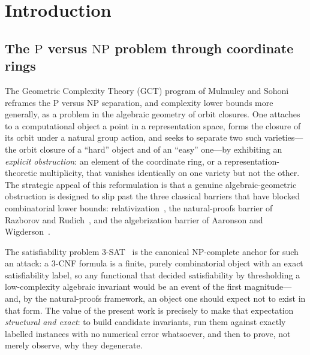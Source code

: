 \documentclass[pdflatex,sn-mathphys-num]{sn-jnl}
\theoremstyle{thmstyleone}%
\theoremstyle{thmstyletwo}%
\theoremstyle{thmstylethree}%
\begin{document}
\maketitle
\section{Introduction}\label{sec:intro}

\subsection{The \texorpdfstring{$\mathrm{P}$ versus $\mathrm{NP}$}{P vs NP} problem through
coordinate rings}

The Geometric Complexity Theory (GCT) program of Mulmuley and
Sohoni~\cite{GCT1,GCT2,MulmuleyCACM} reframes the $\mathrm{P}$ versus
$\mathrm{NP}$ separation, and complexity lower bounds more generally, as a
problem in the algebraic geometry of orbit closures. One attaches to a
computational object a point in a representation space, forms the closure
of its orbit under a natural group action, and seeks to separate two such
varieties---the orbit closure of a ``hard'' object and of an ``easy''
one---by exhibiting an \emph{explicit obstruction}: an element of the
coordinate ring, or a representation-theoretic multiplicity, that vanishes
identically on one variety but not the other. The strategic appeal of this
reformulation is that a genuine algebraic-geometric obstruction is designed
to slip past the three classical barriers that have blocked combinatorial
lower bounds: relativization~\cite{BGS}, the natural-proofs barrier of
Razborov and Rudich~\cite{RR}, and the algebrization barrier of Aaronson
and Wigderson~\cite{AW}.

The satisfiability problem $3$-SAT~\cite{Cook,GareyJohnson} is the canonical
$\mathrm{NP}$-complete anchor for such an attack: a $3$-CNF formula is a
finite, purely combinatorial object with an exact satisfiability label, so
any functional that decided satisfiability by thresholding a low-complexity
algebraic invariant would be an event of the first magnitude---and, by the
natural-proofs framework, an object one should expect not to exist in that
form. The value of the present work is precisely to make that expectation
\emph{structural and exact}: to build candidate invariants, run them
against exactly labelled instances with no numerical error whatsoever, and
then to prove, not merely observe, why they degenerate.
\end{document}
